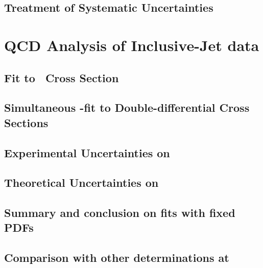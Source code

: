 \subsection{Treatment of Systematic Uncertainties}
\label{subsec:sysunctreatment}


\section{QCD Analysis of Inclusive-Jet data}
\label{sec:asfit}


\subsection{Fit to \dsdetjetb~Cross Section}
\label{subsec:singledifasfit}


\subsection{Simultaneous \asz-fit to Double-differential Cross Sections}
\label{subsec:doubledifasfit}


\subsection{Experimental Uncertainties on \asz}
\label{subsec:asexpunc}


\subsection{Theoretical Uncertainties on \asz}
\label{subsec:asthunc}


\subsection{Summary and conclusion on \asz fits with fixed PDFs}
\label{subsec:minisummary_asfit}


\subsection{Comparison with other \asz determinations at \hera}
\label{subsec:minisummary_comp}


% 